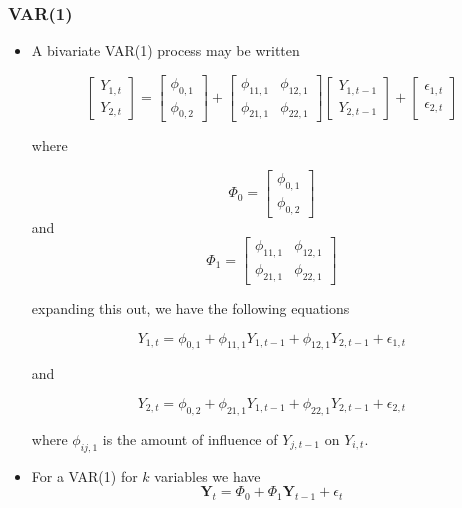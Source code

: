 \documentclass[11pt]{article}
\begin{document}
\subsubsection{VAR(1)}
\begin{itemize}
    \item A bivariate VAR(1) process may be written 
    
    \[
    \begin{bmatrix}
        Y_{1,t} \\
        Y_{2,t}
    \end{bmatrix} = 
    \begin{bmatrix}
        \phi_{0,1} \\ 
        \phi_{0,2}
    \end{bmatrix} +
    \begin{bmatrix}
        \phi_{11,1} & \phi_{12,1} \\ 
        \phi_{21,1} & \phi_{22,1} 
    \end{bmatrix}
    \begin{bmatrix}
        Y_{1,t-1} \\
        Y_{2,t-1}
    \end{bmatrix}
    + 
    \begin{bmatrix}
        \epsilon_{1,t} \\
        \epsilon_{2,t}
    \end{bmatrix}
    \]

    where 
    
    \[
    \Phi_0 = 
    \begin{bmatrix}
        \phi_{0,1} \\ 
        \phi_{0,2}
    \end{bmatrix}    
    \]
    and
    \[
    \Phi_1 =     
    \begin{bmatrix}
        \phi_{11,1} & \phi_{12,1} \\ 
        \phi_{21,1} & \phi_{22,1} 
    \end{bmatrix}
    \]
    
    expanding this out, we have the following equations 

    \[ Y_{1,t} = \phi_{0,1} + \phi_{11,1} Y_{1,t-1} + \phi_{12,1} Y_{2,t-1} + \epsilon_{1,t} \]

    and

    \[ Y_{2,t} = \phi_{0,2} + \phi_{21,1} Y_{1,t-1} + \phi_{22,1} Y_{2,t-1} + \epsilon_{2,t} \]

    where $\phi_{ij,1}$ is the amount of influence of $Y_{j, t-1}$ on $Y_{i,t}$. 
    \item For a VAR(1) for $k$ variables we have 
    \[ \boldsymbol{Y}_t = \Phi_0 + \Phi_1 \boldsymbol{Y}_{t-1} + \epsilon_t \]
\end{itemize}
\end{document}
